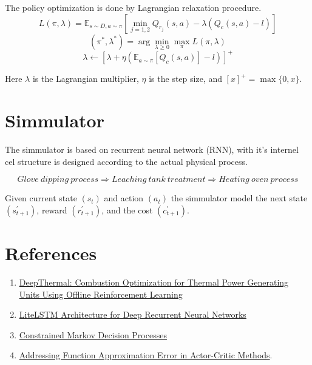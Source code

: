 \documentclass{article}
\newcommand{\E}{\mathbb E}
\begin{document}
The policy optimization is done by Lagrangian relaxation procedure.
\[L(\pi,\lambda) = \E_{s \sim D,a \sim \pi}\left[\min_{j=1,2} Q_{r_j}(s,a) - \lambda (Q_c(s,a) - l)\right]\]
\[(\pi^{*},\lambda^{*}) = \arg \min_{\lambda \ge 0} \max_{\pi} L(\pi, \lambda)\]
\[\lambda \leftarrow {\left[\lambda + \eta \left(\E_{a\sim \pi}\left[Q_c(s,a)\right] - l\right)\right]}^{+}\]

Here \(\lambda\) is the Lagrangian multiplier, \(\eta\) is the step size, and \([x]^{+} = \max\{0,x\}\).

\section{Simmulator}
The simmulator is based on recurrent neural network (RNN), with it's internel cel structure is designed according 
to the actual physical process.

\[Glove\ dipping\ process \Rightarrow Leaching\ tank\ treatment \Rightarrow Heating\ oven\ process\]

Given current state \((s_t)\) and action \((a_t)\) the simmulator model the next state \((s_{t+1}^{'})\), reward \((r_{t+1}^{'})\), 
and the cost \((c_{t+1}^{'})\). 

\section{References}
\begin{enumerate}
  \item \href{https://arxiv.org/pdf/2102.11492.pdf}{DeepThermal: Combustion Optimization for
  Thermal Power Generating Units Using Offline Reinforcement Learning}
  \item \href{https://arxiv.org/pdf/2201.11624.pdf}{LiteLSTM Architecture for Deep Recurrent Neural
  Networks}
  \item \href{https://www-sop.inria.fr/members/Eitan.Altman/TEMP/h.pdf}{Constrained Markov Decision Processes}
  \item \href{https://arxiv.org/pdf/1802.09477v3.pdf}{Addressing Function Approximation Error in Actor-Critic Methods}.
\end{enumerate}
\end{document}
